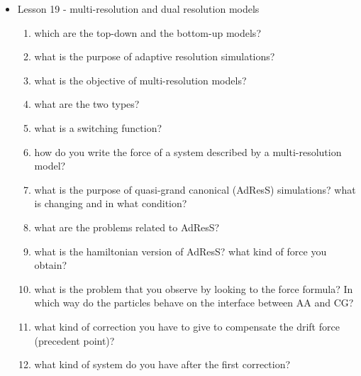{\begin{itemize}
\begin{enumerate}
        \item how can you intend the position of a knot on a length? what type of ... you expect on the stationary points?
        \item what is interesting about knots in proteins? why you don't expect them?
        \item what characteristics are necessary for self-folding? what type of measures do you adopt as a consequence?
        \item what is an elastic folder model? what is its main role?
        \item what is the process through which you evlaluate the folding rate through the elastic folder model
        \item What type of measure do you adopt to evaluate the folding process?
        \item what is the RMSD?
        \item what is a LASSO protein? 
    \end{enumerate}
    \item Lesson 19 - multi-resolution and dual resolution models
    \begin{enumerate}
        \item which are the top-down and the bottom-up models?
        \item what is the purpose of adaptive resolution simulations?
        \item what is the objective of multi-resolution models?
        \item what are the two types?
        \item what is a switching function?
        \item how do you write the force of a system described by a multi-resolution model?
        \item what is the purpose of quasi-grand canonical (AdResS) simulations? what is changing and in what condition?
        \item what are the problems related to AdResS?
        \item what is the hamiltonian version of AdResS? what kind of force you obtain?
        \item what is the problem that you observe by looking to the force formula? In which way do the particles behave on the interface between AA and CG?
        \item what kind of correction you have to give to compensate the drift force (precedent point)?
        \item what kind of system do you have after the first correction?

\end{enumerate}
\end{itemize}}
